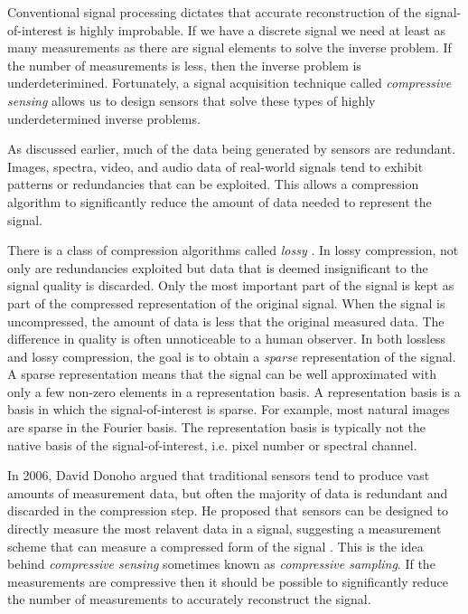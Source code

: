 Conventional signal processing dictates that accurate reconstruction of the signal-of-interest is highly improbable. If we have a discrete signal we need at least as many measurements as there are signal elements to solve the inverse problem. If the number of measurements is less, then the inverse problem is underdeterimined. Fortunately, a signal acquisition technique called \emph{compressive sensing} allows us to design sensors that solve these types of highly underdetermined inverse problems.

As discussed earlier, much of the data being generated by sensors are redundant. Images, spectra, video, and audio data of real-world signals tend to exhibit patterns or redundancies that can be exploited. This allows a compression algorithm to significantly reduce the amount of data needed to represent the signal. 

There is a class of compression algorithms called \emph{lossy} \cite{usevitch2001tutorial}. In lossy compression, not only are redundancies exploited but data that is deemed insignificant to the signal quality is discarded. Only the most important part of the signal is kept as part of the compressed representation of the original signal. When the signal is uncompressed, the amount of data is less that the original measured data. The difference in quality is often unnoticeable to a human observer. In both lossless and lossy compression, the goal is to obtain a \emph{sparse} representation of the signal. A sparse representation means that the signal can be well approximated with only a few non-zero elements in a representation basis. A representation basis is a basis in which the signal-of-interest is sparse. For example, most natural images are sparse in the Fourier basis. The representation basis is typically not the native basis of the signal-of-interest, i.e. pixel number or spectral channel.

In 2006, David Donoho argued that traditional sensors tend to produce vast amounts of measurement data, but often the majority of data is redundant and discarded in the compression step. He proposed that sensors can be designed to directly measure the most relavent data in a signal, suggesting a measurement scheme that can measure a compressed form of the signal \cite{donoho2006compressed}. This is the idea behind \emph{compressive sensing} sometimes known as \emph{compressive sampling}. If the measurements are compressive then it should be possible to significantly reduce the number of measurements to accurately reconstruct the signal. 

